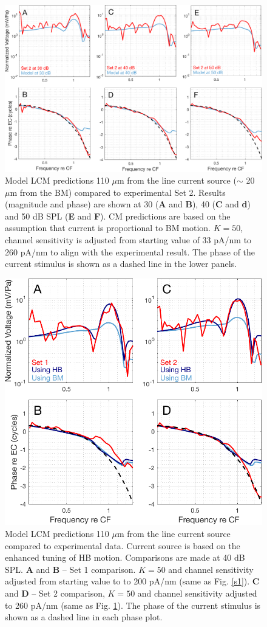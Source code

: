 \documentclass{biophys-new}
\begin{document}
\begin{figure}[h]
\centering
\includegraphics[width = \textwidth]{final_figures/compset2110um.pdf}
\caption{Model LCM predictions 110 $\mu$m from the line current source ($\sim$ 20 $\mu$m from the BM) compared to experimental Set 2. Results (magnitude and phase) are shown at 30 (\textbf{A} and \textbf{B}), 40 (\textbf{C} and \textbf{d}) and 50 dB SPL (\textbf{E} and \textbf{F}). CM predictions are based on the assumption that current is proportional to BM motion.  $K=50$, channel sensitivity is adjusted from starting value of 33 pA/nm to 260 pA/nm to align with the experimental result. The phase of the current stimulus is shown as a dashed line in the lower panels.}
\label{s2}
\end{figure}

\begin{figure}[h]
\centering
\includegraphics[width = 10 cm]{final_figures/comp hb110um.pdf}
\caption{Model LCM predictions 110 $\mu$m from the line current source compared to experimental data. Current source is based on the enhanced tuning of HB motion. Comparisons are made at 40 dB SPL. \textbf{A} and \textbf{B} -- Set 1 comparison. $K=50$ and channel sensitivity adjusted from starting value to to 200 pA/nm (same as Fig. \ref{s1}). \textbf{C} and \textbf{D} -- Set 2 comparison, $K=50$ and channel sensitivity adjusted to 260 pA/nm (same as Fig. \ref{s2}).  The phase of the current stimulus is shown as a dashed line in each phase plot.  }
\label{sTF}
\end{figure}
\end{document}
